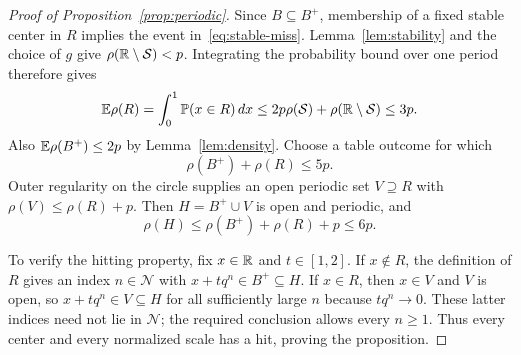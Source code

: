 \begin{proof}[Proof of Proposition~\ref{prop:periodic}]
Since $B\subseteq B^+$, membership of a fixed stable center in $R$
implies the event in~\eqref{eq:stable-miss}.  Lemma~\ref{lem:stability}
and the choice of $g$ give $\rho(\mathbb R\setminus\mathcal S)<p$.
Integrating the probability bound over one period therefore gives
\[
 \mathbb E\rho(R)
 =\int_0^1\mathbb P(x\in R)\,dx
 \le2p\rho(\mathcal S)+\rho(\mathbb R\setminus\mathcal S)
 \le3p.
\]
Also $\mathbb E\rho(B^+)\le2p$ by Lemma~\ref{lem:density}.
Choose a table outcome for which
\[
 \rho(B^+)+\rho(R)\le5p.
\]
Outer regularity on the circle supplies an open periodic set
$V\supseteq R$ with $\rho(V)\le\rho(R)+p$.
Then $H=B^+\cup V$ is open and periodic, and
\[
 \rho(H)\le\rho(B^+)+\rho(R)+p\le6p.
\]

To verify the hitting property, fix $x\in\mathbb R$ and $t\in[1,2]$.
If $x\notin R$, the definition of $R$ gives an index $n\in\mathcal N$
with $x+tq^n\in B^+\subseteq H$.
If $x\in R$, then $x\in V$ and $V$ is open, so
$x+tq^n\in V\subseteq H$ for all sufficiently large $n$ because
$tq^n\to0$.  These latter indices need not lie in $\mathcal N$;
the required conclusion allows every $n\ge1$.  Thus every center and
every normalized scale has a hit, proving the proposition.
\end{proof}
